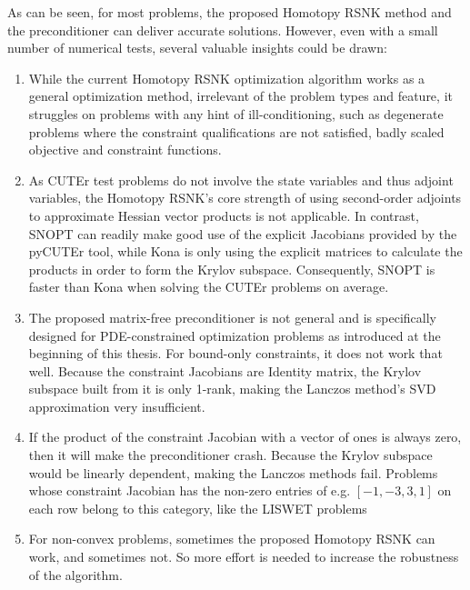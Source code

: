 As can be seen, for most problems, the proposed Homotopy RSNK method and the preconditioner can deliver accurate solutions.  However, even with a small number of numerical tests, several valuable insights could be drawn: 
\begin{enumerate}
\item While the current Homotopy RSNK optimization algorithm works as a general optimization method, irrelevant of the problem types and feature, it struggles on problems with any hint of ill-conditioning, such as degenerate problems where the constraint qualifications are not satisfied, badly scaled objective and constraint functions. 
\item As CUTEr test problems do not involve the state variables and thus adjoint variables, the Homotopy RSNK's core strength of using second-order adjoints to approximate Hessian vector products is not applicable. In contrast, SNOPT can readily make good use of the explicit Jacobians 
provided by the pyCUTEr tool, while Kona is only using the explicit matrices to calculate the products in order to form the Krylov subspace. Consequently, SNOPT is faster than Kona when solving the CUTEr problems on average.   
\item The proposed matrix-free preconditioner is not general and is specifically designed for PDE-constrained optimization problems as introduced at the beginning of this thesis.  For bound-only constraints, it does not work that well. Because the constraint Jacobians are Identity matrix, the Krylov subspace built from it is only 1-rank, making the Lanczos method's SVD approximation very insufficient.  
\item If the product of the constraint Jacobian with a vector of ones is always zero, then it will make the preconditioner crash. Because the Krylov subspace would be linearly dependent, making the Lanczos methods fail. Problems whose constraint Jacobian has the non-zero entries of e.g. $[-1, -3, 3, 1]$ on each row belong to this category, like the LISWET problems 
\item For non-convex problems, sometimes the proposed Homotopy RSNK can work, and sometimes not. So more effort is needed to increase the robustness of the algorithm. 
\end{enumerate} 

 
 
